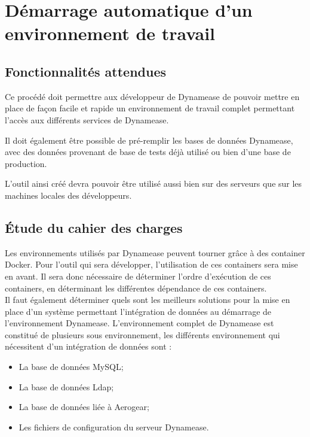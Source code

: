 \section{Démarrage automatique d'un environnement de travail}

\subsection{Fonctionnalités attendues}

Ce procédé doit permettre aux développeur de Dynamease de pouvoir mettre en place de façon facile et rapide un environnement de travail complet permettant l'accès aux différents services de Dynamease. 

Il doit également être possible de pré-remplir les bases de données Dynamease, avec des données provenant de base de tests déjà utilisé ou bien d'une base de production.

L'outil ainsi créé devra pouvoir être utilisé aussi bien sur des serveurs que sur les machines locales des développeurs. 

\subsection{Étude du cahier des charges}

Les environnements utilisés par Dynamease peuvent tourner grâce à des container Docker. Pour l'outil qui sera développer, l'utilisation de ces containers sera mise en avant. Il sera donc nécessaire de déterminer l'ordre d'exécution de ces containers, en déterminant les différentes dépendance de ces containers.\\

Il faut également déterminer quels sont les meilleurs solutions pour la mise en place d'un système permettant l'intégration de données au démarrage de l'environnement Dynamease. L'environnement complet de Dynamease est constitué de plusieurs sous environnement, les différents environnement qui nécessitent d'un intégration de données sont :

\begin{itemize}
	\item La base de données MySQL;
	\item La base de données Ldap;
	\item La base de données liée à Aerogear;
	\item Les fichiers de configuration du serveur Dynamease.
\end{itemize}


